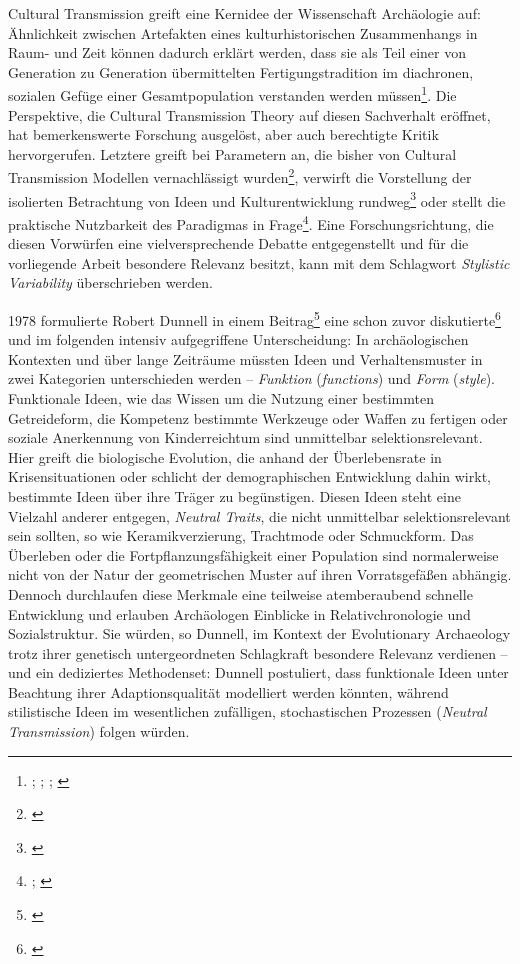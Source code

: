 \documentclass[openany,twoside,twocolumn]{book}
\let\rmarkdownfootnote\footnote%
\def\footnote{\protect\rmarkdownfootnote}
\begin{document}
Cultural Transmission greift eine Kernidee der Wissenschaft Archäologie
auf: Ähnlichkeit zwischen Artefakten eines kulturhistorischen
Zusammenhangs in Raum- und Zeit können dadurch erklärt werden, dass sie
als Teil einer von Generation zu Generation übermittelten
Fertigungstradition im diachronen, sozialen Gefüge einer
Gesamtpopulation verstanden werden müssen\footnote{\textcite{lyman_culture_2001};
  \textcite{lyman_measuring_2000}; \textcite{lyman_rise_1997};
  \textcite{obrien_epistemological_2002}}. Die Perspektive, die Cultural
Transmission Theory auf diesen Sachverhalt eröffnet, hat bemerkenswerte
Forschung ausgelöst, aber auch berechtigte Kritik hervorgerufen.
Letztere greift bei Parametern an, die bisher von Cultural Transmission
Modellen vernachlässigt wurden\footnote{\textcite{dobres_creativity_2000}},
verwirft die Vorstellung der isolierten Betrachtung von Ideen und
Kulturentwicklung rundweg\footnote{\textcite{mithen_cognitive_1997}}
oder stellt die praktische Nutzbarkeit des Paradigmas in Frage\footnote{\textcite{dunnell_archaeology_1992};
  \textcite{schiffer_memes_2003}}. Eine Forschungsrichtung, die diesen
Vorwürfen eine vielversprechende Debatte entgegenstellt und für die
vorliegende Arbeit besondere Relevanz besitzt, kann mit dem Schlagwort
\emph{Stylistic Variability} überschrieben werden.

1978 formulierte Robert Dunnell in einem Beitrag\footnote{\textcite{dunnell1978style}}
eine schon zuvor diskutierte\footnote{\textcite{eerkens_cultural_2007}}
und im folgenden intensiv aufgegriffene Unterscheidung: In
archäologischen Kontexten und über lange Zeiträume müssten Ideen und
Verhaltensmuster in zwei Kategorien unterschieden werden --
\emph{Funktion} (\emph{functions}) und \emph{Form} (\emph{style}).
Funktionale Ideen, wie das Wissen um die Nutzung einer bestimmten
Getreideform, die Kompetenz bestimmte Werkzeuge oder Waffen zu fertigen
oder soziale Anerkennung von Kinderreichtum sind unmittelbar
selektionsrelevant. Hier greift die biologische Evolution, die anhand
der Überlebensrate in Krisensituationen oder schlicht der
demographischen Entwicklung dahin wirkt, bestimmte Ideen über ihre
Träger zu begünstigen. Diesen Ideen steht eine Vielzahl anderer
entgegen, \emph{Neutral Traits}, die nicht unmittelbar
selektionsrelevant sein sollten, so wie Keramikverzierung, Trachtmode
oder Schmuckform. Das Überleben oder die Fortpflanzungsfähigkeit einer
Population sind normalerweise nicht von der Natur der geometrischen
Muster auf ihren Vorratsgefäßen abhängig. Dennoch durchlaufen diese
Merkmale eine teilweise atemberaubend schnelle Entwicklung und erlauben
Archäologen Einblicke in Relativchronologie und Sozialstruktur. Sie
würden, so Dunnell, im Kontext der Evolutionary Archaeology trotz ihrer
genetisch untergeordneten Schlagkraft besondere Relevanz verdienen --
und ein dediziertes Methodenset: Dunnell postuliert, dass funktionale
Ideen unter Beachtung ihrer Adaptionsqualität modelliert werden könnten,
während stilistische Ideen im wesentlichen zufälligen, stochastischen
Prozessen (\emph{Neutral Transmission}) folgen würden.
\end{document}
